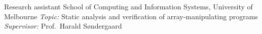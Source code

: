 \documentclass[9pt]{developercv} %
\begin{document}
\begin{entrylist}
        {Research assistant}
        {School of Computing and Information Systems, University of Melbourne}
        {\textit{Topic:} Static analysis and verification of array-manipulating programs\\
        \textit{Supervisor:} Prof.\ Harald S\o ndergaard}
\end{entrylist}


\end{document}
